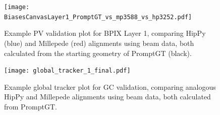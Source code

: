 \begin{figure}[!hbt]
    \begin{center}
        \texttt{[image: BiasesCanvasLayer1\_PromptGT\_vs\_mp3588\_vs\_hp3252.pdf]}
        \caption{Example PV validation plot for BPIX Layer 1, comparing HipPy (blue) and Millepede (red) alignments using beam data, both calculated from the starting geometry of PromptGT (black).}
        \label{fig:BiasesCanvasLayer1_PromptGT_vs_mp3588_vs_hp3252}
    \end{center}
\end{figure}
\begin{figure}[!hbt]
    \begin{center}
        \texttt{[image: global\_tracker\_1\_final.pdf]}
        \caption{Example global tracker plot for GC validation, comparing analogous HipPy and Millepede alignments using beam data, both calculated from PromptGT.}
        \label{fig:global_tracker_1_final}
    \end{center}
\end{figure}

